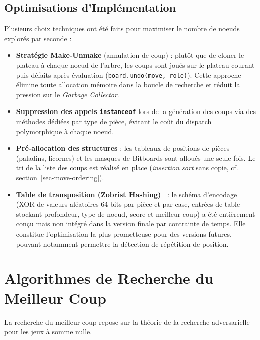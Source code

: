 \documentclass[12pt,a4paper]{article}
\begin{document}
\subsection{Optimisations d'Implémentation}
Plusieurs choix techniques ont été faits pour maximiser le nombre de noeuds explorés par seconde :
\begin{itemize}
  \item \textbf{Stratégie Make-Unmake} (annulation de coup) : plutôt que de cloner le plateau à chaque noeud de l'arbre, les coups sont joués sur le plateau courant puis défaits après évaluation (\texttt{board.undo(move, role)}). Cette approche élimine toute allocation mémoire dans la boucle de recherche et réduit la pression sur le \textit{Garbage Collector}.
    \item \textbf{Suppression des appels \texttt{instanceof}} lors de la génération des coups via des méthodes dédiées par type de pièce, évitant le coût du dispatch polymorphique à chaque noeud.
    \item \textbf{Pré-allocation des structures} : les tableaux de positions de pièces (paladins, licornes) et les masques de Bitboards sont alloués une seule fois. Le tri de la liste des coups est réalisé en place (\textit{insertion sort} sans copie, cf. section~\ref{sec-move-ordering}).
    \item \textbf{Table de transposition (Zobrist Hashing)~\cite{cp_zobrist}} : le schéma d'encodage (XOR de valeurs aléatoires 64 bits par pièce et par case, entrées de table stockant profondeur, type de noeud, score et meilleur coup) a été entièrement conçu mais non intégré dans la version finale par contrainte de temps. Elle constitue l'optimisation la plus prometteuse pour des versions futures, pouvant notamment permettre la détection de répétition de position.
\end{itemize}






\section{Algorithmes de Recherche du Meilleur Coup}
La recherche du meilleur coup repose sur la théorie de la recherche adversarielle pour les jeux à somme nulle.
\end{document}
